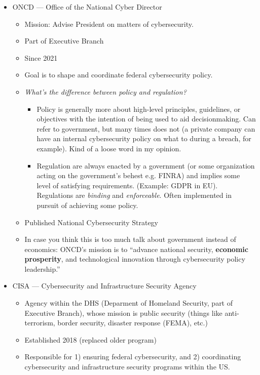\documentclass[11pt]{article}
\begin{document}
\begin{itemize}
    \item ONCD --- Office of the National Cyber Director
    \begin{itemize}
        \item Mission: Advise President on matters of cybersecurity.
        \item Part of Executive Branch
        \item Since 2021
        \item Goal is to shape and coordinate federal cybersecurity policy.
        \item {\it What's the difference between policy and regulation?} 
        \begin{itemize}
            \item Policy is generally more about high-level principles, guidelines, or objectives with the intention of being used to aid decisionmaking. Can refer to government, but many times does not (a private company can have an internal cybersecurity policy on what to during a breach, for example). Kind of a loose word in my opinion.
            \item Regulation are always enacted by a government (or some organization acting on the government's behest e.g. FINRA) and implies some level of satisfying requirements. (Example: GDPR in EU). Regulations are {\it binding} and {\it enforceable}. Often implemented in pursuit of achieving some policy. 
        \end{itemize} 
        \item Published National Cybersecurity Strategy
        \item In case you think this is too much talk about government instead of economics: ONCD's mission is to ``advance national security, {\bf economic prosperity}, and technological innovation through cybersecurity policy leadership.''
    \end{itemize}
    \item CISA --- Cybersecurity and Infrastructure Security Agency
    \begin{itemize}
        \item Agency within the DHS (Deparment of Homeland Security, part of Executive Branch), whose mission is public security (things like anti-terrorism, border security, disaster response (FEMA), etc.)
        \item Established 2018 (replaced older program)
        \item Responsible for 1) ensuring federal cybersecurity, and 2) coordinating cybersecurity and infrastructure security programs within the US.

\end{itemize}
\end{itemize}
\end{document}

